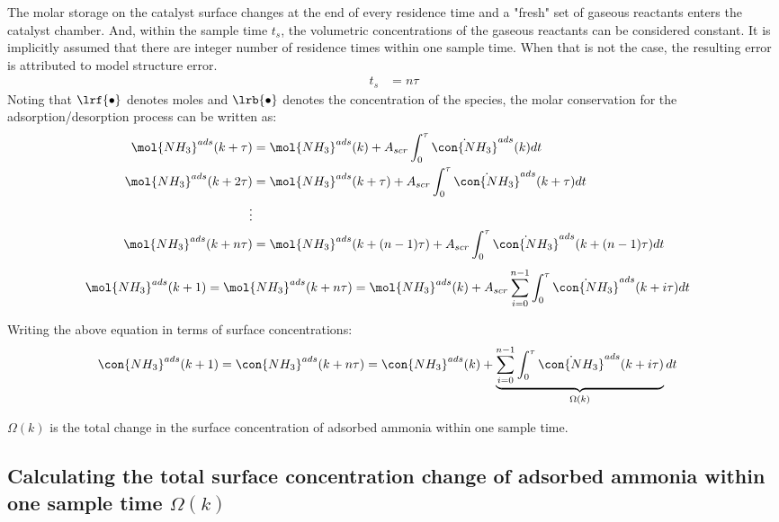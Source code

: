 The molar storage on the catalyst surface changes at the end of every residence time and a "fresh" set of gaseous
reactants enters the catalyst chamber. And, within the sample time $t_s$, the volumetric concentrations of the gaseous
reactants can be considered constant.  It is implicitly
assumed that there are integer number of residence times within one sample time. When that is not the case, the
resulting error is attributed to model structure error.
\begin{align}
    t_s &= n \tau
    \label{eqn::ts_2_tau}
\end{align}
Noting that $\lrf{\bullet}$ denotes moles and $\lrb{\bullet}$ denotes the concentration of the species, the molar conservation for the adsorption/desorption process can be written as:
\begin{align*}
    \mol{NH_3}^{ads} (k + \tau) &= \mol{NH_3}^{ads} (k) + A_{scr} \int_{0}^{\tau} \dot{\con{NH_3}}^{ads} (k) dt\\
    \mol{NH_3}^{ads} (k + 2\tau) &= \mol{NH_3}^{ads} (k + \tau) + A_{scr} \int_{0}^{\tau} \dot{\con{NH_3}}^{ads} (k + \tau) dt\\
    \vdots&\\
    \mol{NH_3}^{ads} (k + n\tau) &= \mol{NH_3}^{ads} (k + (n-1)\tau) + A_{scr} \int_{0}^{\tau} \dot{\con{NH_3}}^{ads} (k + (n-1)\tau) dt
\end{align*}
\begin{align*}
    \mol{NH_3}^{ads}(k + 1) = \mol{NH_3}^{ads} (k + n\tau) &= \mol{NH_3}^{ads} (k) + A_{scr} \sum_{i=0}^{n-1} \int_{0}^{\tau} \dot{\con{NH_3}}^{ads} (k + i\tau) dt
\end{align*}

Writing the above equation in terms of surface concentrations:
\begin{align*}
    \con{NH_3}^{ads}(k + 1) = \con{NH_3}^{ads} (k + n\tau) &= \con{NH_3}^{ads} (k) + \underbrace{\sum_{i=0}^{n-1} \int_{0}^{\tau} \dot{\con{NH_3}}^{ads} (k + i\tau)}_{\Omega(k)}   dt
\end{align*}

$\Omega(k)$ is the total change in the surface concentration of adsorbed ammonia
within one sample time.

\subsection{Calculating the total surface concentration change of adsorbed ammonia within one sample time $\Omega(k)$}

